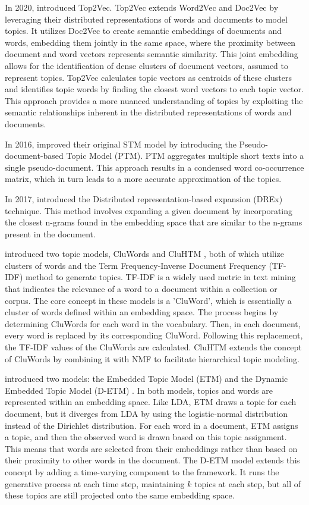 \documentclass{article}
\begin{document}
In 2020, \citet{angelov_top2vec_2020} introduced Top2Vec. Top2Vec extends Word2Vec and Doc2Vec by leveraging their distributed representations of words and documents to model topics. It utilizes Doc2Vec to create semantic embeddings of documents and words, embedding them jointly in the same space, where the proximity between document and word vectors represents semantic similarity. This joint embedding allows for the identification of dense clusters of document vectors, assumed to represent topics. Top2Vec calculates topic vectors as centroids of these clusters and identifies topic words by finding the closest word vectors to each topic vector. This approach provides a more nuanced understanding of topics by exploiting the semantic relationships inherent in the distributed representations of words and documents.

In 2016, \citet{zuo_topic_2016} improved their original STM model by introducing the Pseudo-document-based Topic Model (PTM). PTM aggregates multiple short texts into a single pseudo-document. This approach results in a condensed word co-occurrence matrix, which in turn leads to a more accurate approximation of the topics.

In 2017, \citet{bicalho_general_2017} introduced the Distributed representation-based expansion (DREx) technique. This method involves expanding a given document by incorporating the closest n-grams found in the embedding space that are similar to the n-grams present in the document.

\citeauthor{viegas_cluwords_2019} introduced two topic models, CluWords \cite{viegas_cluwords_2019} and CluHTM \cite{viegas_cluhtm_2020}, both of which utilize clusters of words and the Term Frequency-Inverse Document Frequency (TF-IDF) method to generate topics. TF-IDF is a widely used metric in text mining that indicates the relevance of a word to a document within a collection or corpus. The core concept in these models is a 'CluWord', which is essentially a cluster of words defined within an embedding space. The process begins by determining CluWords for each word in the vocabulary. Then, in each document, every word is replaced by its corresponding CluWord. Following this replacement, the TF-IDF values of the CluWords are calculated. CluHTM extends the concept of CluWords by combining it with NMF to facilitate hierarchical topic modeling.

\citeauthor{dieng_topic_2020} introduced two models: the Embedded Topic Model (ETM) \cite{dieng_topic_2020} and the Dynamic Embedded Topic Model (D-ETM) \cite{dieng_dynamic_2019}. In both models, topics and words are represented within an embedding space. Like LDA, ETM draws a topic for each document, but it diverges from LDA by using the logistic-normal distribution instead of the Dirichlet distribution. For each word in a document, ETM assigns a topic, and then the observed word is drawn based on this topic assignment. This means that words are selected from their embeddings rather than based on their proximity to other words in the document. The D-ETM model extends this concept by adding a time-varying component to the framework. It runs the generative process at each time step, maintaining $k$ topics at each step, but all of these topics are still projected onto the same embedding space.
\end{document}
